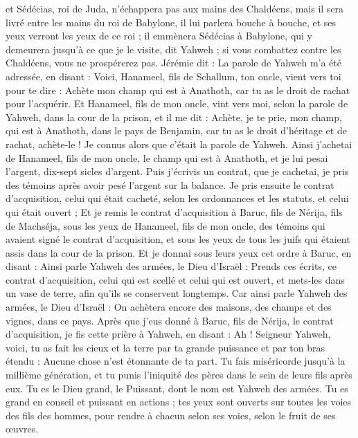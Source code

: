 \begin{multicols}{2}
et Sédécias, roi de Juda, n'échappera pas aux mains des Chaldéens, mais il sera livré entre les mains du roi de Babylone, il lui parlera bouche à bouche, et ses yeux verront les yeux de ce roi ;
il emmènera Sédécias à Babylone, qui y demeurera jusqu’à ce que je le visite, dit Yahweh ; si vous combattez contre les Chaldéens, vous ne prospérerez pas.
Jérémie dit : La parole de Yahweh m'a été adressée, en disant :
Voici, Hanameel, fils de Schallum, ton oncle, vient vers toi pour te dire : Achète mon champ qui est à Anathoth, car tu as le droit de rachat pour l’acquérir.
Et Hanameel, fils de mon oncle, vint vers moi, selon la parole de Yahweh, dans la cour de la prison, et il me dit : Achète, je te prie, mon champ, qui est à Anathoth, dans le pays de Benjamin, car tu as le droit d’héritage et de rachat, achète-le ! Je connus alors que c'était la parole de Yahweh.
Ainsi j'achetai de Hanameel, fils de mon oncle, le champ qui est à Anathoth, et je lui pesai l'argent, dix-sept sicles d'argent.
Puis j'écrivis un contrat, que je cachetai, je pris des témoins après avoir pesé l'argent sur la balance.
Je pris ensuite le contrat d’acquisition, celui qui était cacheté, selon les ordonnances et les statuts, et celui qui était ouvert ;
Et je remis le contrat d’acquisition à Baruc, fils de Nérija, fils de Machséja, sous les yeux de Hanameel, fils de mon oncle, des témoins qui avaient signé le contrat d’acquisition, et sous les yeux de tous les juifs qui étaient assis dans la cour de la prison.
Et je donnai sous leurs yeux cet ordre à Baruc, en disant :
Ainsi parle Yahweh des armées, le Dieu d'Israël : Prends ces écrits, ce contrat d’acquisition, celui qui est scellé et celui qui est ouvert, et mets-les dans un vase de terre, afin qu'ils se conservent longtemps.
Car ainsi parle Yahweh des armées, le Dieu d'Israël : On achètera encore des maisons, des champs et des vignes, dans ce pays.
Après que j’eus donné à Baruc, fils de Nérija, le contrat d’acquisition, je fis cette prière à Yahweh, en disant :
Ah ! Seigneur Yahweh, voici, tu as fait les cieux et la terre par ta grande puissance et par ton bras étendu : Aucune chose n’est étonnante de ta part.
Tu fais miséricorde jusqu'à la millième génération, et tu punis l'iniquité des pères dans le sein de leurs fils après eux. Tu es le Dieu grand, le Puissant, dont le nom est Yahweh des armées.
Tu es grand en conseil et puissant en actions ; tes yeux sont ouverts sur toutes les voies des fils des hommes, pour rendre à chacun selon ses voies, selon le fruit de ses œuvres.

\end{multicols}
